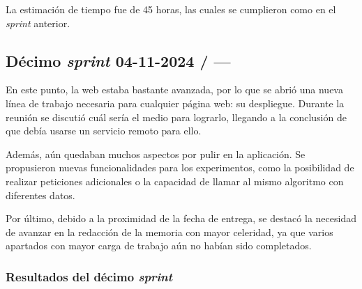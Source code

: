 La estimación de tiempo fue de 45 horas, las cuales se cumplieron como en el \textit{sprint} anterior.

\subsection{Décimo \textit{sprint} 04-11-2024 / ---}

En este punto, la web estaba bastante avanzada, por lo que se abrió una nueva línea de trabajo necesaria para cualquier página web: su despliegue. Durante la reunión se discutió cuál sería el medio para lograrlo, llegando a la conclusión de que debía usarse un servicio remoto para ello.

Además, aún quedaban muchos aspectos por pulir en la aplicación. Se propusieron nuevas funcionalidades para los experimentos, como la posibilidad de realizar peticiones adicionales o la capacidad de llamar al mismo algoritmo con diferentes datos.

Por último, debido a la proximidad de la fecha de entrega, se destacó la necesidad de avanzar en la redacción de la memoria con mayor celeridad, ya que varios apartados con mayor carga de trabajo aún no habían sido completados.

\subsubsection{Resultados del décimo \textit{sprint}}

